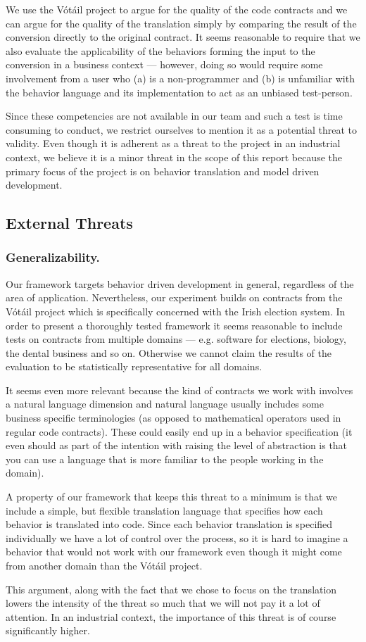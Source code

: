 We use the V\'{o}t\'{a}il project to argue for the quality of the code contracts and we can argue for the quality of the translation simply by comparing the result of the conversion directly to the original contract.
It seems reasonable to require that we also evaluate the applicability of the behaviors forming the input to the conversion in a business context --- however, doing so would require some involvement from a user who (a) is a non-programmer and (b) is unfamiliar with the behavior language and its implementation to act as an unbiased test-person.

Since these competencies are not available in our team and such a test is time consuming to conduct, we restrict ourselves to mention it as a potential threat to validity.
Even though it is adherent as a threat to the project in an industrial context, we believe it is a minor threat in the scope of this report because the primary focus of the project is on behavior translation and model driven development.

\subsection{External Threats}
\subsubsection{Generalizability.}
Our framework targets behavior driven development in general, regardless of the area of application.
Nevertheless, our experiment builds on contracts from the V\'{o}t\'{a}il project which is specifically concerned with the Irish election system.
In order to present a thoroughly tested framework it seems reasonable to include tests on contracts from multiple domains --- e.g. software for elections, biology, the dental business and so on.
Otherwise we cannot claim the results of the evaluation to be statistically representative for all domains.
 
It seems even more relevant because the kind of contracts we work with involves a natural language dimension and natural language usually includes some business specific terminologies (as opposed to mathematical operators used in regular code contracts).
These could easily end up in a behavior specification (it even should as part of the intention with raising the level of abstraction is that you can use a language that is more familiar to the people working in the domain).
 
A property of our framework that keeps this threat to a minimum is that we include a simple, but flexible translation language that specifies how each behavior is translated into code.
Since each behavior translation is specified individually we have a lot of control over the process, so it is hard to imagine a behavior that would not work with our framework even though it might come from another domain than the V\'{o}t\'{a}il project.
 
This argument, along with the fact that we chose to focus on the translation lowers the intensity of the threat so much that we will not pay it a lot of attention.
In an industrial context, the importance of this threat is of course significantly higher.
